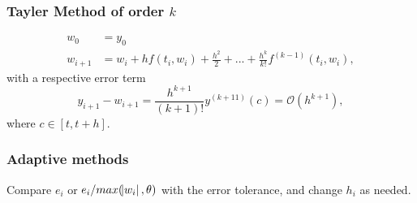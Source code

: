 \subsubsection{Tayler Method of order $k$}
\begin{align*}
    w_0 & = y_0 \\
    w_{i+1} & = w_i + h f(t_i, w_i) + \frac{h^2}{2} + ... + \frac{h^k}{k!}f^{(k-1)}(t_i, w_i),
\end{align*}
with a respective error term 
$$
y_{i+1} - w_{i+1}  =  \frac{h^{k+1}}{(k+1)!}y^{(k+11)}(c) = \mathcal{O}(h^{k+1}),
$$
where $c \in [t, t+h]$.

\subsubsection{Adaptive methods}
Compare $e_i$ or $e_i/max(\abs{w_i}, \theta)$ with the error tolerance, and change $h_i$ as needed. 